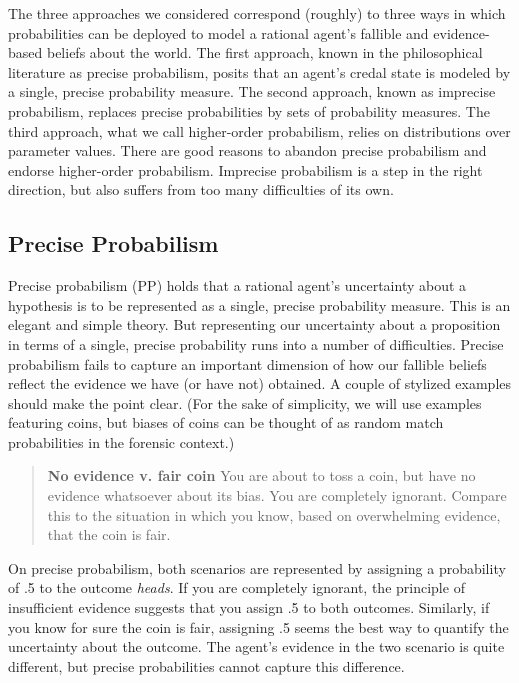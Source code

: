 \documentclass[
  10pt,
  dvipsnames,enabledeprecatedfontcommands]{scrartcl}
\begin{document}
The three approaches we considered correspond (roughly) to three ways in
which probabilities can be deployed to model a rational agent's fallible
and evidence-based beliefs about the world. The first approach, known in
the philosophical literature as precise probabilism, posits that an
agent's credal state is modeled by a single, precise probability
measure. The second approach, known as imprecise probabilism, replaces
precise probabilities by sets of probability measures. The third
approach, what we call higher-order probabilism, relies on distributions
over parameter values. There are good reasons to abandon precise
probabilism and endorse higher-order probabilism. Imprecise probabilism
is a step in the right direction, but also suffers from too many
difficulties of its own.

\hypertarget{precise-probabilism}{%
\subsection{Precise Probabilism}\label{precise-probabilism}}

Precise probabilism (\textsf{PP}) holds that a rational agent's
uncertainty about a hypothesis is to be represented as a single, precise
probability measure. This is an elegant and simple theory. But
representing our uncertainty about a proposition in terms of a single,
precise probability runs into a number of difficulties. Precise
probabilism fails to capture an important dimension of how our fallible
beliefs reflect the evidence we have (or have not) obtained. A couple of
stylized examples should make the point clear. (For the sake of
simplicity, we will use examples featuring coins, but biases of coins
can be thought of as random match probabilities in the forensic
context.)

\begin{quote}
\textbf{No evidence v. fair coin}
You are about to toss a coin, but have no evidence 
whatsoever about its bias. You are completely ignorant. 
Compare this to the situation in which you know, 
based on overwhelming evidence, that the coin is fair. 
\end{quote}

\noindent On precise probabilism, both scenarios are represented by
assigning a probability of .5 to the outcome \emph{heads}. If you are
completely ignorant, the principle of insufficient evidence suggests
that you assign .5 to both outcomes. Similarly, if you know for sure the
coin is fair, assigning .5 seems the best way to quantify the
uncertainty about the outcome. The agent's evidence in the two scenario
is quite different, but precise probabilities cannot capture this
difference.
\end{document}
